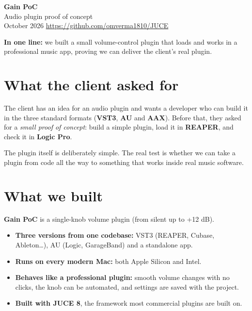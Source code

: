 \documentclass[11pt,a4paper]{article}
\begin{document}
{\LARGE\bfseries\color{accent} Gain PoC}\\[2pt]
{\large Audio plugin proof of concept}\\[2pt]
{\small\color{gray} October 2026 \quad\textbullet\quad \url{https://github.com/omverma1810/JUCE}}

\vspace{6pt}
\begin{tcolorbox}[colback=soft,colframe=accent,boxrule=0.6pt,arc=2pt]
\textbf{In one line:} we built a small volume-control plugin that loads and works in a
professional music app, proving we can deliver the client's real plugin.
\end{tcolorbox}

\section{What the client asked for}
The client has an idea for an audio plugin and wants a developer who can build it in the
three standard formats (\textbf{VST3}, \textbf{AU} and \textbf{AAX}). Before that, they asked for a
\emph{small proof of concept}: build a simple plugin, load it in \textbf{REAPER}, and check
it in \textbf{Logic Pro}.

The plugin itself is deliberately simple. The real test is whether we can take a plugin
from code all the way to something that works inside real music software.

\section{What we built}
\textbf{Gain PoC} is a single-knob volume plugin (from silent up to +12 dB).
\begin{itemize}
  \item \textbf{Three versions from one codebase:} VST3 (REAPER, Cubase, Ableton\dots),
        AU (Logic, GarageBand) and a standalone app.
  \item \textbf{Runs on every modern Mac:} both Apple Silicon and Intel.
  \item \textbf{Behaves like a professional plugin:} smooth volume changes with no clicks,
        the knob can be automated, and settings are saved with the project.
  \item \textbf{Built with JUCE 8}, the framework most commercial plugins are built on.
\end{itemize}
\end{document}
